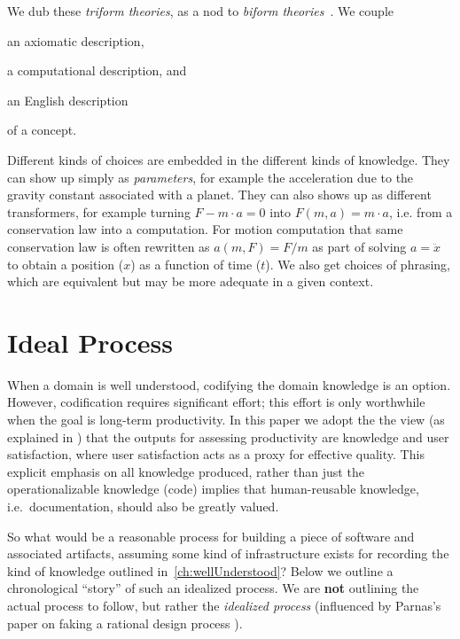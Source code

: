 \documentclass[sigconf,review]{acmart}
\begin{document}
We dub these \emph{triform theories}, as a nod to \emph{biform
theories}~\cite{Farmer2007}. We couple 
\begin{enumerate*}
\item an axiomatic description,
\item a computational description, and
\item an English description
\end{enumerate*}
of a concept.

Different kinds of choices are embedded in the different kinds of knowledge.
They can show up simply as \emph{parameters}, for example the acceleration due
to the gravity constant associated with a planet. They can also shows up as
different transformers, for example turning $F - m\cdot a = 0$ into $F\left(m,
a\right) = m\cdot a$, i.e. from a conservation law into a computation.
For motion computation that same conservation law is often rewritten as
$a\left(m,F\right) = F/m$ as part of solving $a = \ddot{x}$ to obtain a position
($x$) as a function of time ($t$). We also get choices of phrasing, which are
equivalent but may be more adequate in a given context.

\section{Ideal Process}\label{ch:process}

When a domain is well understood, codifying the domain knowledge is an option.
However, codification requires significant effort; this effort is only
worthwhile when the goal is long-term productivity.  In this paper we adopt the
the view (as explained in \cite{SmithAndCarette2020arXiv}) that the outputs for
assessing productivity are knowledge and user satisfaction, where user
satisfaction acts as a proxy for effective quality. This explicit emphasis on
all knowledge produced, rather than just the operationalizable knowledge (code)
implies that human-reusable knowledge, i.e.\ documentation, should also be
greatly valued.

So what would be a reasonable process for building a piece of software and
associated artifacts, assuming some kind of infrastructure exists for recording
the kind of knowledge outlined in~\autoref{ch:wellUnderstood}?  Below we outline
a chronological ``story'' of such an idealized process.  We are \textbf{not}
outlining the actual process to follow, but rather the \emph{idealized process}
(influenced by Parnas's paper on faking a rational design process
\cite{Parnas1986}).
\end{document}
